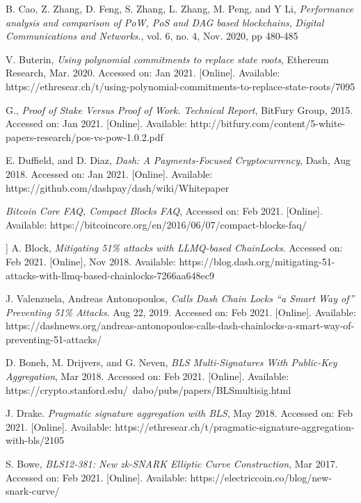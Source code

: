 \documentclass{ctexart}
\begin{document}
\begin{thebibliography}{00}
 B. Cao, Z. Zhang, D. Feng, S. Zhang, L. Zhang, M. Peng, and
Y Li, \textit{Performance analysis and comparison of PoW, PoS and DAG based blockchains}, \emph{Digital Communications and Networks}., vol. 6, no. 4, Nov. 2020, pp 480-485

 V. Buterin, \textit{Using polynomial commitments to replace state roots}, Ethereum Research, Mar. 2020. Accessed on: Jan 2021. [Online]. Available: https://ethresear.ch/t/using-polynomial-commitments-to-replace-state-roots/7095

 G., \textit{Proof of Stake Versus Proof of Work. Technical Report}, BitFury Group, 2015. Accessed on: Jan 2021. [Online]. Available: http://bitfury.com/content/5-white-papers-research/pos-vs-pow-1.0.2.pdf 

 E. Duffield, and D. Diaz, \textit{Dash: A Payments-Focused Cryptocurrency}, Dash, Aug 2018. Accessed on: Jan 2021. [Online]. Available: https://github.com/dashpay/dash/wiki/Whitepaper

 \textit{Bitcoin Core FAQ, Compact Blocks FAQ}, Accessed on: Feb 2021. [Online]. Available: https://bitcoincore.org/en/2016/06/07/compact-blocks-faq/

 ] A. Block, \textit{Mitigating 51\% attacks with LLMQ-based ChainLocks}. Accessed on: Feb 2021. [Online], Nov 2018. Available: https://blog.dash.org/mitigating-51-attacks-with-llmq-based-chainlocks-7266aa648ec9

 J. Valenzuela, Andreas Antonopoulos, \textit{Calls Dash Chain Locks “a Smart Way of” Preventing 51\% Attacks}. Aug 22, 2019. Accessed on: Feb 2021. [Online]. Available: https://dashnews.org/andreas-antonopoulos-calls-dash-chainlocks-a-smart-way-of-preventing-51-attacks/

 D. Boneh, M. Drijvers, and G. Neven, \textit{BLS Multi-Signatures With Public-Key Aggregation}, Mar 2018. Accessed on: Feb 2021. [Online]. Available: https://crypto.stanford.edu/~dabo/pubs/papers/BLSmultisig.html

 J. Drake. \textit{Pragmatic signature aggregation with BLS}, May 2018. Accessed on: Feb 2021. [Online]. Available:  https://ethresear.ch/t/pragmatic-signature-aggregation-with-bls/2105

 S. Bowe, \textit{BLS12-381: New zk-SNARK Elliptic Curve Construction}, Mar 2017. Accessed on: Feb 2021. [Online]. Available: https://electriccoin.co/blog/new-snark-curve/


\end{thebibliography}
\end{document}
